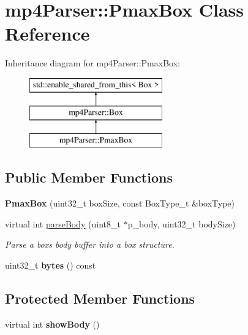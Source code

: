\hypertarget{classmp4_parser_1_1_pmax_box}{}\section{mp4\+Parser\+::Pmax\+Box Class Reference}
\label{classmp4_parser_1_1_pmax_box}
Inheritance diagram for mp4\+Parser\+::Pmax\+Box\+:\begin{figure}[H]
\begin{center}
\leavevmode
\includegraphics[height=3.000000cm]{classmp4_parser_1_1_pmax_box}
\end{center}
\end{figure}
\subsection*{Public Member Functions}
\begin{DoxyCompactItemize}
\item 
\mbox{\label{classmp4_parser_1_1_pmax_box_a81f2b70763a916535d6cb0e5d715403d}} 
{\bfseries Pmax\+Box} (uint32\+\_\+t box\+Size, const Box\+Type\+\_\+t \&box\+Type)
\item 
virtual int \mbox{\hyperlink{classmp4_parser_1_1_pmax_box_a0a5929ce9d30eb5a3c840c8321f133cd}{parse\+Body}} (uint8\+\_\+t $\ast$p\+\_\+body, uint32\+\_\+t body\+Size)
\begin{DoxyCompactList}\small\item\em Parse a box\textquotesingle{}s body buffer into a box structure. \end{DoxyCompactList}\item 
\mbox{\label{classmp4_parser_1_1_pmax_box_a3c1a67e3aec1cfc86938fef2064d4580}} 
uint32\+\_\+t {\bfseries bytes} () const
\end{DoxyCompactItemize}
\subsection*{Protected Member Functions}
\begin{DoxyCompactItemize}
\item 
\mbox{\label{classmp4_parser_1_1_pmax_box_affbe788a5912b1289c2df0824533c918}} 
virtual int {\bfseries show\+Body} ()
\end{DoxyCompactItemize}
